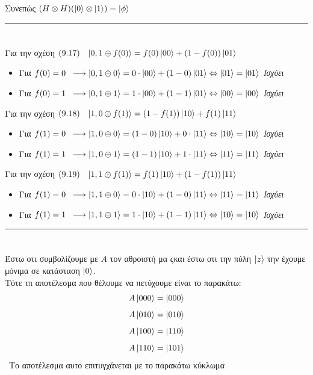 \documentclass[12pt]{article}
\begin{document}
 Συνεπώς $(H \otimes H ) (\ket{0}\otimes \ket{1}) = \ket{\phi}$\\
 \rule{\textwidth}{.5pt}
 
 \section*{{}}
 Για την σχέση $(9.17)\;\;\;\ket{0,1\oplus f(0)}= f(0)\ket{00}  + (1-f(0))\ket{01}$ 
 \begin{itemize}
    \item Για $f(0) = 0\;\;\longrightarrow \ket{0,1\oplus 0} = 0\cdot\ket{00}  + (1-0)\ket{01} \Leftrightarrow \ket{01} = \ket{01}$   {\it Ισχύει}
    \item Για $f(0) = 1\;\;\longrightarrow \ket{0,1\oplus 1} = 1\cdot\ket{00}  + (1-1)\ket{01} \Leftrightarrow \ket{00} = \ket{00}$   {\it Ισχύει}
\end{itemize}
Για την σχέση $(9.18)\;\;\;\ket{1,0\oplus f(1)}= (1-f(1))\ket{10}  + f(1)\ket{11}$ 
 \begin{itemize}
    \item Για $f(1) = 0\;\;\longrightarrow \ket{1,0\oplus 0}= (1-0)\ket{10}  + 0\cdot \ket{11} \Leftrightarrow \ket{10} = \ket{10}$   {\it Ισχύει}
    \item Για $f(1) = 1\;\;\longrightarrow \ket{1,0\oplus 1} =(1-1)\ket{10}  + 1\cdot \ket{11} \Leftrightarrow \ket{11} = \ket{11}$   {\it Ισχύει}
\end{itemize}
Για την σχέση $(9.19)\;\;\;\ket{1,1\oplus f(1)}= f(1)\ket{10}+(1-f(1))\ket{11}  $ 
 \begin{itemize}
    \item Για $f(1) = 0\;\;\longrightarrow \ket{1,1\oplus 0}= 0\cdot\ket{10}  + (1-0)\ket{11} \Leftrightarrow \ket{11} = \ket{11}$   {\it Ισχύει}
    \item Για $f(1) = 1\;\;\longrightarrow \ket{1,1\oplus 1}= 1\cdot\ket{10}  + (1-1)\ket{11} \Leftrightarrow \ket{10} = \ket{10}$   {\it Ισχύει}\\
 \end{itemize}
 \rule{\textwidth}{.5pt}
 
 \section*{{}}
 Έστω οτι συμβολίζουμε με $Α$ τον αθροιστή μα ςκαι έστω οτι την πύλη $\ket{z}$ την έχουμε μόνιμα σε κατάσταση $\ket{0}$.\\ 
 Τότε τπ αποτέλεσμα που θέλουμε να πετύχουμε είναι το παρακάτω:
 $$A\ket{000} = \ket{000}$$
 $$A\ket{010} = \ket{010}$$
 $$A\ket{100} = \ket{110}$$
 $$A\ket{110} = \ket{101}$$\
 Tο αποτέλεσμα αυτο επιτυγχάνεται με το παρακάτω κύκλωμα
\end{document}

